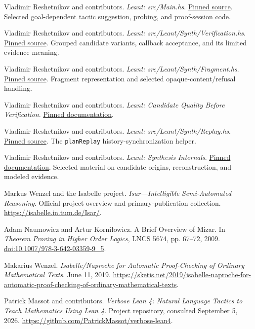 \documentclass[11pt,a4paper]{article}
\newcommand{\code}[1]{\nolinkurl{#1}}
\newcommand{\lsource}[2]{\href{https://github.com/VladimirReshetnikov/Leant/blob/c36adf114035fb2fba6c276b63944cc613b31668/#1}{#2}}
\theoremstyle{definition}
\theoremstyle{remark}
\numberwithin{equation}{section}
\begin{document}
\begin{thebibliography}{99}
Vladimir Reshetnikov and contributors.
\emph{Leant: src/Main.hs}.
\lsource{src/Main.hs}{Pinned source}.
Selected goal-dependent tactic suggestion, probing, and proof-session code.

Vladimir Reshetnikov and contributors.
\emph{Leant: src/Leant/Synth/Verification.hs}.
\lsource{src/Leant/Synth/Verification.hs}{Pinned source}.
Grouped candidate variants, callback acceptance, and its limited evidence meaning.

Vladimir Reshetnikov and contributors.
\emph{Leant: src/Leant/Synth/Fragment.hs}.
\lsource{src/Leant/Synth/Fragment.hs}{Pinned source}.
Fragment representation and selected opaque-content/refusal handling.

Vladimir Reshetnikov and contributors.
\emph{Leant: Candidate Quality Before Verification}.
\lsource{docs/candidate-quality.md}{Pinned documentation}.

Vladimir Reshetnikov and contributors.
\emph{Leant: src/Leant/Synth/Replay.hs}.
\lsource{src/Leant/Synth/Replay.hs}{Pinned source}.
The \code{planReplay} history-synchronization helper.

Vladimir Reshetnikov and contributors.
\emph{Leant: Synthesis Internals}.
\lsource{docs/synth-internals.md}{Pinned documentation}.
Selected material on candidate origins, reconstruction, and modeled evidence.

Markus Wenzel and the Isabelle project.
\emph{Isar---Intelligible Semi-Automated Reasoning}.
Official project overview and primary-publication collection.
\url{https://isabelle.in.tum.de/Isar/}.

Adam Naumowicz and Artur Korni{\l}owicz.
A Brief Overview of Mizar.
In \emph{Theorem Proving in Higher Order Logics}, LNCS 5674, pp. 67--72, 2009.
\href{https://doi.org/10.1007/978-3-642-03359-9_5}{doi:10.1007/978-3-642-03359-9\_5}.

Makarius Wenzel.
\emph{Isabelle/Naproche for Automatic Proof-Checking of Ordinary Mathematical Texts}.
June 11, 2019.
\url{https://sketis.net/2019/isabelle-naproche-for-automatic-proof-checking-of-ordinary-mathematical-texts}.

Patrick Massot and contributors.
\emph{Verbose Lean 4: Natural Language Tactics to Teach Mathematics Using Lean 4}.
Project repository, consulted September 5, 2026.
\url{https://github.com/PatrickMassot/verbose-lean4}.


\end{thebibliography}
\end{document}
